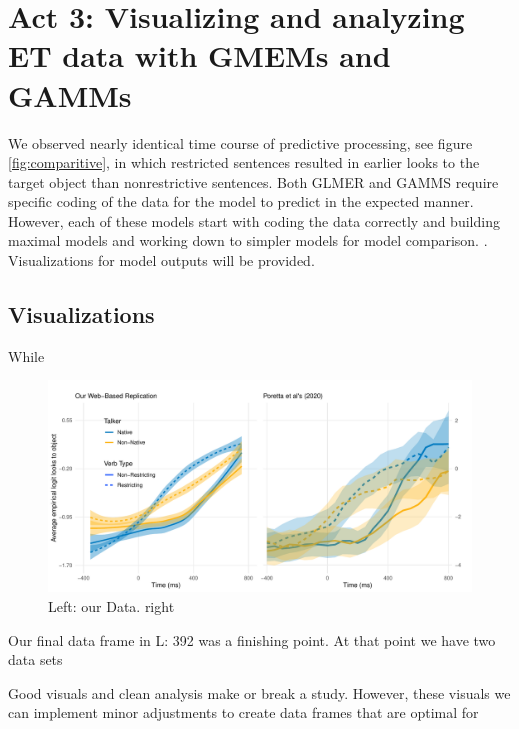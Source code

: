 \section{Act 3: Visualizing and analyzing ET data with GMEMs and GAMMs}

We observed nearly identical time course of predictive processing, see figure \ref{fig:comparitive}, in which restricted sentences resulted in earlier looks to the target object than nonrestrictive sentences. Both GLMER and GAMMS require specific coding of the data for the model to predict in the expected manner. However, each of these models start with coding the data correctly and building maximal models and working down to simpler models for model comparison. \parencite{max model}. Visualizations for model outputs will be provided.

\subsection{Visualizations}
While 





\begin{figure}[h]
    \centering
    \includegraphics[width=\textwidth]{figures/smooth_comparison_plot.pdf}
    \caption{Left: our Data. right \parencite{Porretta_et_al_2020}}
    \label{fig:smooth}
\end{figure}

Our final data frame in L: 392 was a finishing point. At that point we have two data sets

Good visuals and clean analysis make or break a study. However, these visuals we can implement minor adjustments to create data frames that are optimal for







